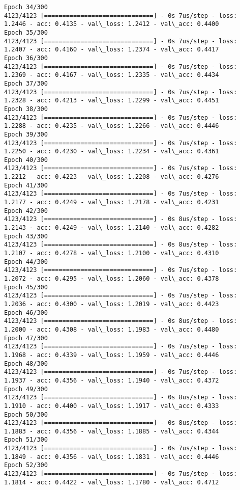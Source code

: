 \documentclass[11pt]{article}
\begin{document}
\begin{Verbatim}[commandchars=\\\{\}]
Epoch 34/300
4123/4123 [==============================] - 0s 7us/step - loss: 1.2446 - acc: 0.4135 - val\_loss: 1.2412 - val\_acc: 0.4400
Epoch 35/300
4123/4123 [==============================] - 0s 7us/step - loss: 1.2407 - acc: 0.4160 - val\_loss: 1.2374 - val\_acc: 0.4417
Epoch 36/300
4123/4123 [==============================] - 0s 7us/step - loss: 1.2369 - acc: 0.4167 - val\_loss: 1.2335 - val\_acc: 0.4434
Epoch 37/300
4123/4123 [==============================] - 0s 7us/step - loss: 1.2328 - acc: 0.4213 - val\_loss: 1.2299 - val\_acc: 0.4451
Epoch 38/300
4123/4123 [==============================] - 0s 7us/step - loss: 1.2288 - acc: 0.4235 - val\_loss: 1.2266 - val\_acc: 0.4446
Epoch 39/300
4123/4123 [==============================] - 0s 7us/step - loss: 1.2250 - acc: 0.4230 - val\_loss: 1.2234 - val\_acc: 0.4361
Epoch 40/300
4123/4123 [==============================] - 0s 7us/step - loss: 1.2212 - acc: 0.4223 - val\_loss: 1.2208 - val\_acc: 0.4276
Epoch 41/300
4123/4123 [==============================] - 0s 7us/step - loss: 1.2177 - acc: 0.4249 - val\_loss: 1.2178 - val\_acc: 0.4231
Epoch 42/300
4123/4123 [==============================] - 0s 8us/step - loss: 1.2143 - acc: 0.4249 - val\_loss: 1.2140 - val\_acc: 0.4282
Epoch 43/300
4123/4123 [==============================] - 0s 8us/step - loss: 1.2107 - acc: 0.4278 - val\_loss: 1.2100 - val\_acc: 0.4310
Epoch 44/300
4123/4123 [==============================] - 0s 7us/step - loss: 1.2072 - acc: 0.4295 - val\_loss: 1.2060 - val\_acc: 0.4378
Epoch 45/300
4123/4123 [==============================] - 0s 7us/step - loss: 1.2036 - acc: 0.4300 - val\_loss: 1.2019 - val\_acc: 0.4423
Epoch 46/300
4123/4123 [==============================] - 0s 8us/step - loss: 1.2000 - acc: 0.4308 - val\_loss: 1.1983 - val\_acc: 0.4480
Epoch 47/300
4123/4123 [==============================] - 0s 7us/step - loss: 1.1968 - acc: 0.4339 - val\_loss: 1.1959 - val\_acc: 0.4446
Epoch 48/300
4123/4123 [==============================] - 0s 7us/step - loss: 1.1937 - acc: 0.4356 - val\_loss: 1.1940 - val\_acc: 0.4372
Epoch 49/300
4123/4123 [==============================] - 0s 8us/step - loss: 1.1910 - acc: 0.4400 - val\_loss: 1.1917 - val\_acc: 0.4333
Epoch 50/300
4123/4123 [==============================] - 0s 8us/step - loss: 1.1883 - acc: 0.4356 - val\_loss: 1.1885 - val\_acc: 0.4344
Epoch 51/300
4123/4123 [==============================] - 0s 7us/step - loss: 1.1849 - acc: 0.4356 - val\_loss: 1.1831 - val\_acc: 0.4446
Epoch 52/300
4123/4123 [==============================] - 0s 7us/step - loss: 1.1814 - acc: 0.4422 - val\_loss: 1.1780 - val\_acc: 0.4712

\end{Verbatim}
\end{document}
